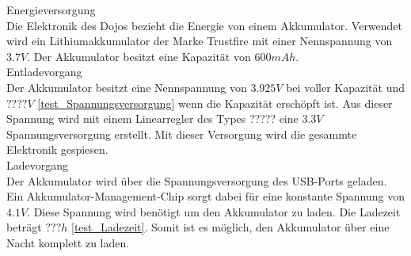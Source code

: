 Energieversorgung\\
Die Elektronik des Dojos bezieht die Energie von einem Akkumulator. Verwendet wird ein Lithiumakkumulator der Marke Trustfire mit einer Nennspannung von $3.7V$. Der Akkumulator besitzt eine Kapazität von $600mAh$.\\

Entladevorgang\\ 
Der Akkumulator besitzt eine Nennspannung von $3.925V$ bei voller Kapazität und $????V$ \ref{test_Spannungsversorgung} wenn die Kapazität erschöpft ist. Aus dieser Spannung wird mit einem Linearregler des Types ????? eine $3.3V$ Spannungsversorgung erstellt. Mit dieser Versorgung wird die gesammte Elektronik gespiesen.\\

Ladevorgang\\
Der Akkumulator wird über die Spannungsversorgung des USB-Ports geladen. Ein Akkumulator-Management-Chip sorgt dabei für eine konstante Spannung von $4.1V$. Diese Spannung wird benötigt um den Akkumulator zu laden. Die Ladezeit beträgt $???h$ \ref{test_Ladezeit}. Somit ist es möglich, den Akkumulator über eine Nacht komplett zu laden. 

